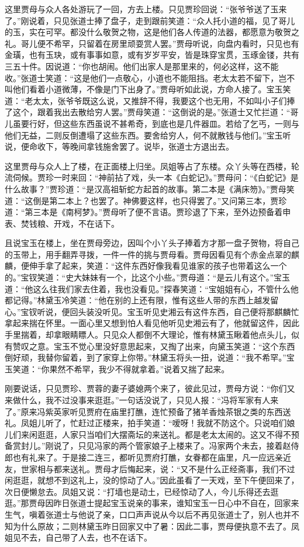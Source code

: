 这里贾母与众人各处游玩了一回，方去上楼。只见贾珍回说：``张爷爷送了玉来了。''刚说着，只见张道士捧了盘子，走到跟前笑道：``众人托小道的福，见了哥儿的玉，实在可罕。都没什么敬贺之物，这是他们各人传道的法器，都愿意为敬贺之礼。哥儿便不希罕，只留着在房里顽耍赏人罢。''贾母听说，向盘内看时，只见也有金璜，也有玉玦，或有事事如意，或有岁岁平安，皆是珠穿宝贯，玉琢金镂，共有三五十件。因说道：``你也胡闹。他们出家人是那里来的，何必这样，这不能收。''张道士笑道：``这是他们一点敬心，小道也不能阻挡。老太太若不留下，岂不叫他们看着小道微薄，不像是门下出身了。''贾母听如此说，方命人接了。宝玉笑道：``老太太，张爷爷既这么说，又推辞不得，我要这个也无用，不如叫小子们捧了这个，跟着我出去散给穷人罢。''贾母笑道：``这倒说的是。''张道士又忙拦道：``哥儿虽要行好，但这些东西虽说不甚希奇，到底也是几件器皿。若给了乞丐，一则与他们无益，二则反倒遭塌了这些东西。要舍给穷人，何不就散钱与他们。''宝玉听说，便命收下，等晚间拿钱施舍罢了。说毕，张道士方退出去。

这里贾母与众人上了楼，在正面楼上归坐。凤姐等占了东楼。众丫头等在西楼，轮流伺候。贾珍一时来回：``神前拈了戏，头一本《白蛇记》。''贾母问：``《白蛇记》是什么故事？''贾珍道：``是汉高祖斩蛇方起首的故事。第二本是《满床笏》。''贾母笑道：``这倒是第二本上？也罢了。神佛要这样，也只得罢了。''又问第三本，贾珍道：``第三本是《南柯梦》。''贾母听了便不言语。贾珍退了下来，至外边预备着申表、焚钱粮、开戏，不在话下。

且说宝玉在楼上，坐在贾母旁边，因叫个小丫头子捧着方才那一盘子贺物，将自己的玉带上，用手翻弄寻拨，一件一件的挑与贾母看。贾母因看见有个赤金点翠的麒麟，便伸手拿了起来，笑道：``这件东西好像我看见谁家的孩子也带着这么一个的。''宝钗笑道：``史大妹妹有一个，比这个小些。''贾母道：``是云儿有这个。''宝玉道：``他这么往我们家去住着，我也没看见。''探春笑道：``宝姐姐有心，不管什么他都记得。''林黛玉冷笑道：``他在别的上还有限，惟有这些人带的东西上越发留心。''宝钗听说，便回头装没听见。宝玉听见史湘云有这件东西，自己便将那麒麟忙拿起来揣在怀里。一面心里又想到怕人看见他听见史湘云有了，他就留这件，因此手里揣着，却拿眼睛瞟人。只见众人都倒不大理论，惟有林黛玉瞅着他点头儿，似有赞叹之意。宝玉不觉心里没好意思起来，又掏了出来，向黛玉笑道：``这个东西倒好顽，我替你留着，到了家穿上你带。''林黛玉将头一扭，说道：``我不希罕。''宝玉笑道：``你果然不希罕，我少不得就拿着。''说着又揣了起来。

刚要说话，只见贾珍、贾蓉的妻子婆媳两个来了，彼此见过，贾母方说：``你们又来做什么，我不过没事来逛逛。''一句话没说了，只见人报：``冯将军家有人来了。''原来冯紫英家听见贾府在庙里打醮，连忙预备了猪羊香烛茶银之类的东西送礼。凤姐儿听了，忙赶过正楼来，拍手笑道：``嗳呀！我就不防这个。只说咱们娘儿们来闲逛逛，人家只当咱们大摆斋坛的来送礼。都是老太太闹的。这又不得不预备赏封儿。''刚说了，只见冯家的两个管家娘子上楼来了。冯家两个未去，接着赵侍郎也有礼来了。于是接二连三，都听见贾府打醮，女眷都在庙里，凡一应远亲近友，世家相与都来送礼。贾母才后悔起来，说：``又不是什么正经斋事，我们不过闲逛逛，就想不到这礼上，没的惊动了人。''因此虽看了一天戏，至下午便回来了，次日便懒怠去。凤姐又说：``打墙也是动土，已经惊动了人，今儿乐得还去逛逛。''那贾母因昨日张道士提起宝玉说亲的事来，谁知宝玉一日心中不自在，回家来生气，嗔着张道士与他说了亲，口口声声说从今以后不再见张道士了，别人也并不知为什么原故；二则林黛玉昨日回家又中了暑：因此二事，贾母便执意不去了。凤姐见不去，自己带了人去，也不在话下。

